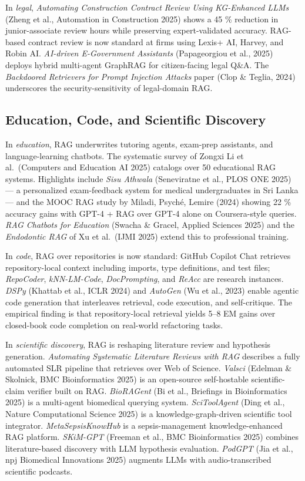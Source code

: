 \documentclass{article}
\begin{document}
In \emph{legal}, \emph{Automating Construction Contract Review Using KG-Enhanced LLMs} (Zheng et al., Automation in Construction 2025) shows a 45 \% reduction in junior-associate review hours while preserving expert-validated accuracy. RAG-based contract review is now standard at firms using Lexis+ AI, Harvey, and Robin AI. \emph{AI-driven E-Government Assistants} (Papageorgiou et al., 2025) deploys hybrid multi-agent GraphRAG for citizen-facing legal Q\&A. The \emph{Backdoored Retrievers for Prompt Injection Attacks} paper (Clop \& Teglia, 2024) underscores the security-sensitivity of legal-domain RAG.

\subsection{Education, Code, and Scientific Discovery}\label{education-code-and-scientific-discovery}

In \emph{education}, RAG underwrites tutoring agents, exam-prep assistants, and language-learning chatbots. The systematic survey of Zongxi Li et al.~(Computers and Education AI 2025) catalogs over 50 educational RAG systems. Highlights include \emph{Sisu Athwala} (Seneviratne et al., PLOS ONE 2025) --- a personalized exam-feedback system for medical undergraduates in Sri Lanka --- and the MOOC RAG study by Miladi, Psyché, Lemire (2024) showing 22 \% accuracy gains with GPT-4 + RAG over GPT-4 alone on Coursera-style queries. \emph{RAG Chatbots for Education} (Swacha \& Gracel, Applied Sciences 2025) and the \emph{Endodontic RAG} of Xu et al.~(IJMI 2025) extend this to professional training.

In \emph{code}, RAG over repositories is now standard: GitHub Copilot Chat retrieves repository-local context including imports, type definitions, and test files; \emph{RepoCoder}, \emph{kNN-LM-Code}, \emph{DocPrompting}, and \emph{ReAcc} are research instances. \emph{DSPy} (Khattab et al., ICLR 2024) and \emph{AutoGen} (Wu et al., 2023) enable agentic code generation that interleaves retrieval, code execution, and self-critique. The empirical finding \citep{zhang2023miraclamultilingua} is that repository-local retrieval yields 5--8 EM gains over closed-book code completion on real-world refactoring tasks.

In \emph{scientific discovery}, RAG is reshaping literature review and hypothesis generation. \emph{Automating Systematic Literature Reviews with RAG} \citep{han20242024} describes a fully automated SLR pipeline that retrieves over Web of Science. \emph{Valsci} (Edelman \& Skolnick, BMC Bioinformatics 2025) is an open-source self-hostable scientific-claim verifier built on RAG. \emph{BioRAGent} (Bi et al., Briefings in Bioinformatics 2025) is a multi-agent biomedical querying system. \emph{SciToolAgent} (Ding et al., Nature Computational Science 2025) is a knowledge-graph-driven scientific tool integrator. \emph{MetaSepsisKnowHub} \citep{zhang20252025} is a sepsis-management knowledge-enhanced RAG platform. \emph{SKiM-GPT} (Freeman et al., BMC Bioinformatics 2025) combines literature-based discovery with LLM hypothesis evaluation. \emph{PodGPT} (Jia et al., npj Biomedical Innovations 2025) augments LLMs with audio-transcribed scientific podcasts.
\end{document}
